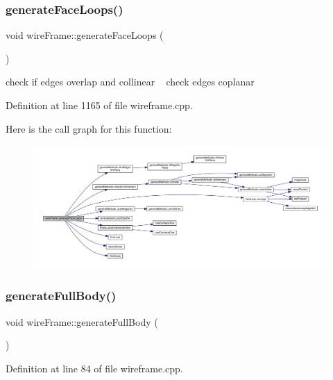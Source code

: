 \subsubsection{\texorpdfstring{generate\+Face\+Loops()}{generateFaceLoops()}}
{\footnotesize\ttfamily void wire\+Frame\+::generate\+Face\+Loops (\begin{DoxyParamCaption}{ }\end{DoxyParamCaption})}

check if edges overlap and collinear ~\newline
check edges coplanar 

Definition at line 1165 of file wireframe.\+cpp.

Here is the call graph for this function\+:
\nopagebreak
\begin{figure}[H]
\begin{center}
\leavevmode
\includegraphics[width=350pt]{classwire_frame_ac5c8d8c3b1b5f693ad46cb54aae1108a_cgraph}
\end{center}
\end{figure}
\mbox{\label{classwire_frame_a66a5ed6072911c6746366c6cadee7f36}} 
\subsubsection{\texorpdfstring{generate\+Full\+Body()}{generateFullBody()}}
{\footnotesize\ttfamily void wire\+Frame\+::generate\+Full\+Body (\begin{DoxyParamCaption}{ }\end{DoxyParamCaption})}



Definition at line 84 of file wireframe.\+cpp.

\mbox{\label{classwire_frame_ad31eeecbba164e703cd67ea11c13df51}} 
